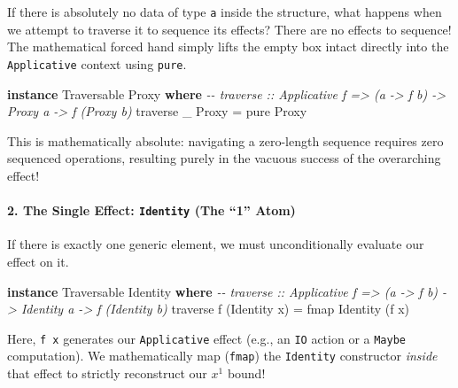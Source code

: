 \documentclass[
]{article}
\newenvironment{Shaded}{}{}
\newcommand{\CommentTok}[1]{\textcolor[rgb]{0.38,0.63,0.69}{\textit{#1}}}
\newcommand{\DataTypeTok}[1]{\textcolor[rgb]{0.56,0.13,0.00}{#1}}
\newcommand{\FunctionTok}[1]{\textcolor[rgb]{0.02,0.16,0.49}{#1}}
\newcommand{\KeywordTok}[1]{\textcolor[rgb]{0.00,0.44,0.13}{\textbf{#1}}}
\newcommand{\NormalTok}[1]{#1}
\newcommand{\OtherTok}[1]{\textcolor[rgb]{0.00,0.44,0.13}{#1}}
\begin{document}
If there is absolutely no data of type \texttt{a} inside the structure,
what happens when we attempt to traverse it to sequence its effects?
There are no effects to sequence! The mathematical forced hand simply
lifts the empty box intact directly into the \texttt{Applicative}
context using \texttt{pure}.

\begin{Shaded}
\begin{Highlighting}[]
\KeywordTok{instance} \DataTypeTok{Traversable} \DataTypeTok{Proxy} \KeywordTok{where}
    \CommentTok{{-}{-} traverse :: Applicative f =\textgreater{} (a {-}\textgreater{} f b) {-}\textgreater{} Proxy a {-}\textgreater{} f (Proxy b)}
    \FunctionTok{traverse}\NormalTok{ \_ }\DataTypeTok{Proxy} \OtherTok{=} \FunctionTok{pure} \DataTypeTok{Proxy}
\end{Highlighting}
\end{Shaded}

This is mathematically absolute: navigating a zero-length sequence
requires zero sequenced operations, resulting purely in the vacuous
success of the overarching effect!

\paragraph{\texorpdfstring{2. The Single Effect: \texttt{Identity} (The
``1''
Atom)}{2. The Single Effect: Identity (The ``1'' Atom)}}\label{the-single-effect-identity-the-1-atom}

If there is exactly one generic element, we must unconditionally
evaluate our effect on it.

\begin{Shaded}
\begin{Highlighting}[]
\KeywordTok{instance} \DataTypeTok{Traversable} \DataTypeTok{Identity} \KeywordTok{where}
    \CommentTok{{-}{-} traverse :: Applicative f =\textgreater{} (a {-}\textgreater{} f b) {-}\textgreater{} Identity a {-}\textgreater{} f (Identity b)}
    \FunctionTok{traverse}\NormalTok{ f (}\DataTypeTok{Identity}\NormalTok{ x) }\OtherTok{=} \FunctionTok{fmap} \DataTypeTok{Identity}\NormalTok{ (f x) }
\end{Highlighting}
\end{Shaded}

Here, \texttt{f\ x} generates our \texttt{Applicative} effect (e.g., an
\texttt{IO} action or a \texttt{Maybe} computation). We mathematically
map (\texttt{fmap}) the \texttt{Identity} constructor \emph{inside} that
effect to strictly reconstruct our \(x^1\) bound!
\end{document}
